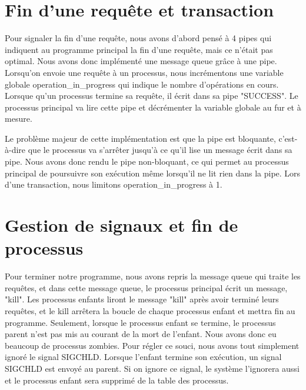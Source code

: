 \documentclass[utf8]{article}
\begin{document}
\section{Fin d'une requête et transaction}

\indent{}
\par

Pour signaler la fin d'une requête, nous avons d'abord pensé à 4 pipes qui indiquent au programme principal 
la fin d'une requête, mais ce n'était pas optimal. Nous avons donc implémenté une message queue grâce à une pipe. Lorsqu'on envoie 
une requête à un processus, nous incrémentons une variable globale operation\_in\_progress qui indique le nombre d'opérations en cours.
Lorsque qu'un processus termine sa requête, il écrit dans sa pipe "SUCCESS". Le processus principal va lire cette pipe et décrémenter
la variable globale au fur et à mesure. 
\par
\indent{}
\par
Le problème majeur de cette implémentation est que la pipe est bloquante, c'est-à-dire que le processus
va s'arrêter jusqu'à ce qu'il lise un message écrit dans sa pipe. Nous avons donc rendu le pipe non-bloquant, ce qui permet au processus principal de poursuivre son exécution
même lorsqu'il ne lit rien dans la pipe. Lors d'une transaction, nous limitons operation\_in\_progress à 1.
\par

\section{Gestion de signaux et fin de processus}
\indent{}
\par
Pour terminer notre programme, nous avons repris la message queue qui traite les requêtes, et dans 
cette message queue, le processus principal écrit un message, "kill". Les processus enfants liront le message "kill" après avoir terminé leurs requêtes,
et le kill arrêtera la boucle de chaque processus enfant et mettra fin au programme.
Seulement, lorsque le processus enfant se termine, le processus parent n'est pas mis au courant de la mort de l'enfant. Nous avons donc eu 
beaucoup de processus zombies. Pour régler ce souci, nous avons tout simplement ignoré le signal SIGCHLD. Lorsque l'enfant termine son exécution,
un signal SIGCHLD est envoyé au parent. Si on ignore ce signal, le système l'ignorera aussi et le processus enfant sera supprimé de la table des processus.
\par
\end{document}
